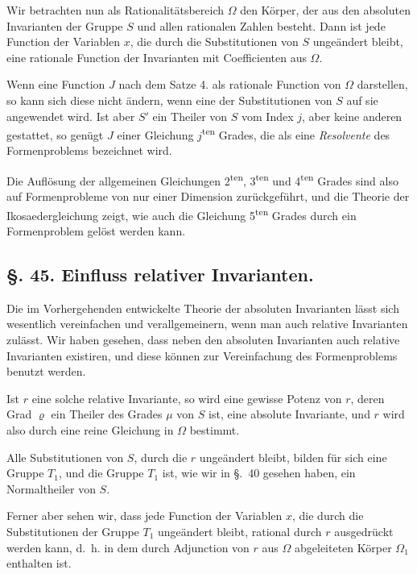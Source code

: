 \documentclass[12pt,a4paper]{article}
\theoremstyle{plain}
\theoremstyle{definition}
\theoremstyle{remark}
\begin{document}
Wir betrachten nun als Rationalitätsbereich $\Omega$ den Körper, der aus den absoluten Invarianten der Gruppe $S$ und allen rationalen Zahlen besteht. Dann ist jede Function der Variablen $x$, die durch die Substitutionen von $S$ ungeändert bleibt, eine rationale Function der Invarianten mit Coefficienten aus $\Omega$.

Wenn eine Function $J$ nach dem Satze 4. als rationale Function von $\Omega$ darstellen, so kann sich diese nicht ändern, wenn eine der Substitutionen von $S$ auf sie angewendet wird. Ist aber $S'$ ein Theiler von $S$ vom Index $j$, aber keine anderen gestattet, so genügt $J$ einer Gleichung $j$\textsuperscript{ten} Grades, die als eine \emph{Resolvente} des Formenproblems bezeichnet wird.

Die Auflösung der allgemeinen Gleichungen 2\textsuperscript{ten}, 3\textsuperscript{ten} und 4\textsuperscript{ten} Grades sind also auf Formenprobleme von nur einer Dimension zurückgeführt, und die Theorie der Ikosaedergleichung zeigt, wie auch die Gleichung 5\textsuperscript{ten} Grades durch ein Formenproblem gelöst werden kann.


\subsection*{\S. 45. Einfluss relativer Invarianten.}

Die im Vorhergehenden entwickelte Theorie der absoluten Invarianten lässt sich wesentlich vereinfachen und verallgemeinern, wenn man auch relative Invarianten zulässt. Wir haben gesehen, dass neben den absoluten Invarianten auch relative Invarianten existiren, und diese können zur Vereinfachung des Formenproblems benutzt werden.

Ist $r$ eine solche relative Invariante, so wird eine gewisse Potenz von $r$, deren Grad $\varrho$ ein Theiler des Grades $\mu$ von $S$ ist, eine absolute Invariante, und $r$ wird also durch eine reine Gleichung in $\Omega$ bestimmt.

Alle Substitutionen von $S$, durch die $r$ ungeändert bleibt, bilden für sich eine Gruppe $T_{1}$, und die Gruppe $T_{1}$ ist, wie wir in \S.~40 gesehen haben, ein Normaltheiler von $S$.

Ferner aber sehen wir, dass jede Function der Variablen $x$, die durch die Substitutionen der Gruppe $T_{1}$ ungeändert bleibt, rational durch $r$ ausgedrückt werden kann, d.~h. in dem durch Adjunction von $r$ aus $\Omega$ abgeleiteten Körper $\Omega_{1}$ enthalten ist.
\end{document}
